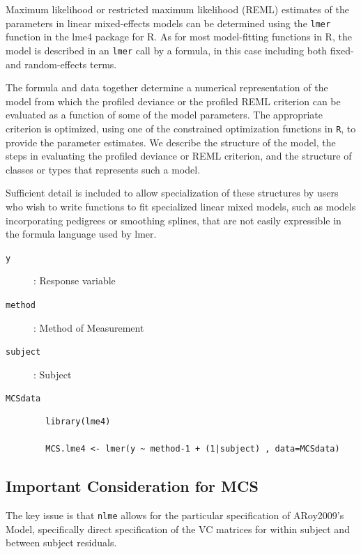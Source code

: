 \documentclass[12pt, a4paper]{report}
\theoremstyle{plain}
\theoremstyle{definition}
\theoremstyle{remark}
\begin{document}
	
	Maximum likelihood or restricted maximum likelihood (REML) estimates of the parameters in linear mixed-effects models can be determined using the \texttt{lmer} function in the lme4 package for R. As for most model-fitting functions in R, the model is described in an \texttt{lmer} call by a formula, in this case including both fixed- and random-effects terms. 
	
	The formula and data together determine a numerical representation of the model from which the profiled deviance or the profiled REML criterion can be evaluated as a function of some of the model parameters. The appropriate criterion is optimized, using one of the constrained optimization functions in \texttt{R}, to provide the parameter estimates. We describe the structure of the model, the steps in evaluating the profiled deviance or REML criterion, and the structure of classes or types that represents such a model. 
	
	Sufficient detail is included to allow specialization of these structures by users who wish to write functions to fit specialized linear mixed models, such as models incorporating pedigrees or smoothing splines, that are not easily expressible in the formula language used by lmer.
	
	
	\begin{description}
		\item[\texttt{y}] : Response variable
		\item[\texttt{method}] : Method of Measurement
		\item[\texttt{subject}] : Subject
		\item[\texttt{MCSdata}] 
	\end{description}
	\begin{framed}
		\begin{verbatim}
		library(lme4)
		
		MCS.lme4 <- lmer(y ~ method-1 + (1|subject) , data=MCSdata)
		\end{verbatim}
	\end{framed}
	\newpage
	
	\subsection{Important Consideration for MCS}
	
	The key issue is that \texttt{nlme} allows for the particular specification of ARoy2009's Model, specifically direct specification of the VC matrices for within subject and between subject residuals.
	
\end{document}
